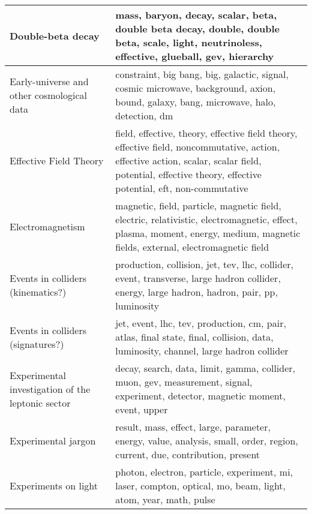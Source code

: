 \begin{longtable}[H]{p{}|p{}}
Double-beta decay                                     &                                                                 mass, baryon, decay, scalar, beta, double beta decay, double, double beta, scale, light, neutrinoless, effective, glueball, gev, hierarchy \\ \midrule
Early-universe and other cosmological data            &                                                                      constraint, big bang, big, galactic, signal, cosmic microwave, background, axion, bound, galaxy, bang, microwave, halo, detection, dm \\ \midrule
Effective Field Theory                                &  field, effective, theory, effective field theory, effective field, noncommutative, action, effective action, scalar, scalar field, potential, effective theory, effective potential, eft, non-commutative \\ \midrule
Electromagnetism                                      &                               magnetic, field, particle, magnetic field, electric, relativistic, electromagnetic, effect, plasma, moment, energy, medium, magnetic fields, external, electromagnetic field \\ \midrule
Events in colliders (kinematics?)                     &                                                               production, collision, jet, tev, lhc, collider, event, transverse, large hadron collider, energy, large hadron, hadron, pair, pp, luminosity \\ \midrule
Events in colliders (signatures?)                     &                                                                         jet, event, lhc, tev, production, cm, pair, atlas, final state, final, collision, data, luminosity, channel, large hadron collider \\ \midrule
Experimental investigation of the leptonic sector     &                                                                           decay, search, data, limit, gamma, collider, muon, gev, measurement, signal, experiment, detector, magnetic moment, event, upper \\ \midrule
Experimental jargon                                   &                                                                                 result, mass, effect, large, parameter, energy, value, analysis, small, order, region, current, due, contribution, present \\ \midrule
Experiments on light                                  &                                                                                              photon, electron, particle, experiment, mi, laser, compton, optical, mo, beam, light, atom, year, math, pulse \\ \midrule

\end{longtable}
